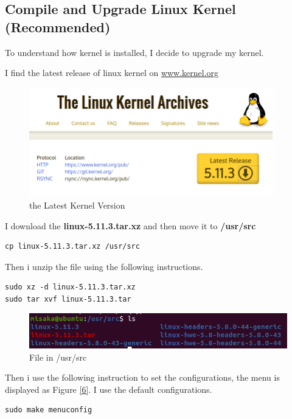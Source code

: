 \documentclass[UTF8,10pt,a4paper]{article}
\theoremstyle{Problem}
\theoremstyle{Solution}
\begin{document}
\subsection{Compile and Upgrade Linux Kernel (Recommended)}
To understand how kernel is installed, I decide to upgrade my kernel.

I find the latest release of linux kernel on \underline{www.kernel.org}

\begin{figure}[H]
    \centering
    \includegraphics[width=300pt]{4.png}
    \caption{the Latest Kernel Version}
    \label{4}
\end{figure}

I download the \textbf{linux-5.11.3.tar.xz} and then move it to \textbf{/usr/src}

\begin{lstlisting}
cp linux-5.11.3.tar.xz /usr/src
\end{lstlisting}

Then i unzip the file using the following instructions.

\begin{lstlisting}
sudo xz -d linux-5.11.3.tar.xz
sudo tar xvf linux-5.11.3.tar
\end{lstlisting}

\begin{figure}[H]
    \centering
    \includegraphics[width=380pt]{5.png}
    \caption{File in /usr/src}
    \label{5}
\end{figure}

Then i use the following instruction to set the configurations, the menu is displayed as Figure \ref{6}. I use the default configurations.

\begin{lstlisting}
sudo make menuconfig
\end{lstlisting}
\end{document}
